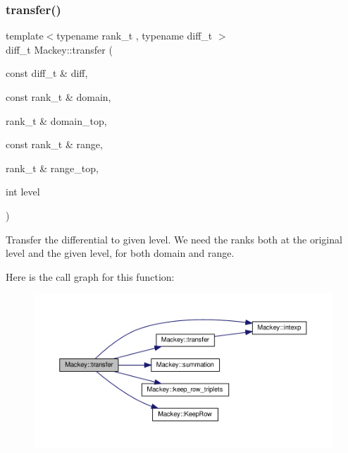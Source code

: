 \subsubsection{\texorpdfstring{transfer()}{transfer()}\hspace{0.1cm}{\footnotesize\ttfamily [2/6]}}
{\footnotesize\ttfamily template$<$typename rank\+\_\+t , typename diff\+\_\+t $>$ \\
diff\+\_\+t Mackey\+::transfer (\begin{DoxyParamCaption}\item[{const diff\+\_\+t \&}]{diff,  }\item[{const rank\+\_\+t \&}]{domain,  }\item[{rank\+\_\+t \&}]{domain\+\_\+top,  }\item[{const rank\+\_\+t \&}]{range,  }\item[{rank\+\_\+t \&}]{range\+\_\+top,  }\item[{int}]{level }\end{DoxyParamCaption})}



Transfer the differential to given level. We need the ranks both at the original level and the given level, for both domain and range. 

Here is the call graph for this function\+:\nopagebreak
\begin{figure}[H]
\begin{center}
\leavevmode
\includegraphics[width=350pt]{namespaceMackey_ad7524839b58c80d4b2c54827e4833b12_cgraph}
\end{center}
\end{figure}
\mbox{\label{namespaceMackey_a914aba7f868e67ae3fd9da3995678660}} 
